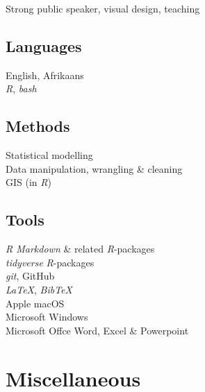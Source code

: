 \documentclass[10pt]{article}
\begin{document}
\begin{multicols}{2}

Strong public speaker, visual design, teaching

\subsection*{Languages}

English, Afrikaans \\
\textit{R}, \textit{bash}

\subsection*{Methods}

Statistical modelling \\
Data manipulation, wrangling \& cleaning \\
GIS (in \textit{R})

\columnbreak

\subsection*{Tools}

\textit{R Markdown} \& related \textit{R}-packages \\
\textit{tidyverse} \textit{R}-packages \\
\textit{git}, GitHub \\
\textit{LaTeX}, \textit{BibTeX} \\
Apple macOS \\
Microsoft Windows \\
Microsoft Offce Word, Excel \& Powerpoint

\end{multicols}

\section*{Miscellaneous} %
\end{document}
